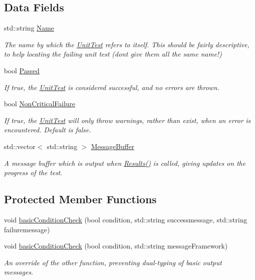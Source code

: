 \subsection*{Data Fields}
\begin{DoxyCompactItemize}
\item 
std\+::string \hyperlink{classJSL_1_1UnitTest_a53c19424147e72fa6392470627f15049}{Name}
\begin{DoxyCompactList}\small\item\em The name by which the \hyperlink{classJSL_1_1UnitTest}{Unit\+Test} refers to itself. This should be fairly descriptive, to help locating the failing unit test (don\textquotesingle{}t give them all the same name!) \end{DoxyCompactList}\item 
bool \hyperlink{classJSL_1_1UnitTest_afac1f363a8406fad39316ee772a837a9}{Passed}
\begin{DoxyCompactList}\small\item\em If true, the \hyperlink{classJSL_1_1UnitTest}{Unit\+Test} is considered successful, and no errors are thrown. \end{DoxyCompactList}\item 
bool \hyperlink{classJSL_1_1UnitTest_a54dc4908d757c7f523be12a4275e595c}{Non\+Critical\+Failure}
\begin{DoxyCompactList}\small\item\em If true, the \hyperlink{classJSL_1_1UnitTest}{Unit\+Test} will only throw warnings, rather than exist, when an error is encountered. Default is false. \end{DoxyCompactList}\item 
std\+::vector$<$ std\+::string $>$ \hyperlink{classJSL_1_1UnitTest_a3dcc71e7e8f72f0f07b8fc552b777ad8}{Message\+Buffer}
\begin{DoxyCompactList}\small\item\em A message buffer which is output when \hyperlink{classJSL_1_1UnitTest_a39e1076dd985334ce21606ae2a383f70}{Results()} is called, giving updates on the progress of the test. \end{DoxyCompactList}\end{DoxyCompactItemize}
\subsection*{Protected Member Functions}
\begin{DoxyCompactItemize}
\item 
void \hyperlink{classJSL_1_1UnitTest_a3629d1bca071da7a2af6b7de29be1430}{basic\+Condition\+Check} (bool condition, std\+::string successmessage, std\+::string failuremessage)
\item 
void \hyperlink{classJSL_1_1UnitTest_a53ede0c6b420eaf64faf752c0518340e}{basic\+Condition\+Check} (bool condition, std\+::string message\+Framework)
\begin{DoxyCompactList}\small\item\em An override of the other function, preventing dual-\/typing of basic output messages. \end{DoxyCompactList}\end{DoxyCompactItemize}


